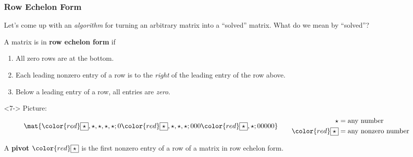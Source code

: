 


\def\rowop#1#2{%
  \hfill%
  \hbox to 0.2\linewidth{\hss\longsquiggly[#1]}%
  \hbox to 0.4\linewidth{\hss#2}%
  }


\begin{frame}
\frametitle{Row Echelon Form}

Let's come up with an \emph{algorithm} for turning an arbitrary matrix into a
``solved'' matrix.
\pause
What do we mean by ``solved''?

\pause

\begin{bluebox}{.8\textwidth}
  A matrix is in \textbf{row echelon form} if

  \pause\smallskip
  \begin{enumerate}
  \item All zero rows are at the bottom.
    \pause
  \item Each leading nonzero entry of a row is to the \emph{right} of the
    leading entry of the row above.
    \pause
  \item Below a leading entry of a row, all entries are \emph{zero}.
  \end{enumerate}
\end{bluebox}

\begin{uncoverenv}<7->
Picture:
\[\mat{
\color{red}\boxed\star,  \star,  \star,  \star,  \star ;
0  \color{red}\boxed\star,  \star,  \star,  \star ;
0  0  0  \color{red}\boxed\star, \star ;
0 0 0 0 0}\qquad
\begin{aligned}
  \star &= \text{any number} \\
  \color{red}\boxed\star &= \text{any nonzero number}
\end{aligned}
\]

\pause[8]
\begin{defn}
  A \textbf{pivot} $\color{red}\boxed\star$ is the first nonzero entry of a row
  of a matrix in row echelon form.
\end{defn}
\end{uncoverenv}

\end{frame}


